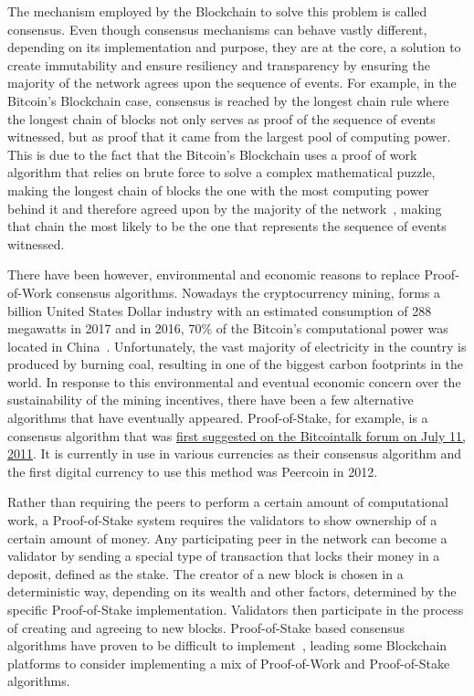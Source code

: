 The mechanism employed by the Blockchain to solve this problem is called
consensus.  Even though consensus mechanisms can behave vastly different,
depending on its implementation and purpose, they are at the core, a solution
to create immutability and ensure resiliency and transparency by ensuring the
majority of the network agrees upon the sequence of events. For example, in the
Bitcoin's Blockchain case, consensus is reached by the longest chain rule where
the longest chain of blocks not only serves as proof of the sequence of events
witnessed, but as proof that it came from the largest pool of computing power.
This is due to the fact that the Bitcoin's Blockchain uses a proof of work
algorithm that relies on brute force to solve a complex mathematical puzzle,
making the longest chain of blocks the one with the most computing power behind
it and therefore agreed upon by the majority of the
network~\cite{Baars2016,Wood2017}, making that chain the most likely to be the
one that represents the sequence of events witnessed.

There have been however, environmental and economic reasons to replace
Proof-of-Work consensus algorithms. Nowadays the cryptocurrency mining, forms a
billion United States Dollar industry with an estimated consumption of 288
megawatts in 2017 and in 2016, 70\% of the Bitcoin's computational power was
located in China~\cite{BitcoinMining2017}.  Unfortunately, the vast majority of
electricity in the country is produced by burning coal, resulting in one of the
biggest carbon footprints in the world. In response to this environmental and
eventual economic concern over the sustainability of the mining incentives,
there have been a few alternative algorithms that have eventually appeared.
Proof-of-Stake, for example, is a consensus algorithm that was
\href{https://bitcointalk.org/index.php?topic=27787.0}{first suggested on the
Bitcointalk forum on July 11, 2011}. It is currently in use in various
currencies as their consensus algorithm and the first digital currency to use
this method was Peercoin in 2012. 

Rather than requiring the peers to perform a certain amount of computational
work, a Proof-of-Stake system requires the validators to show ownership of a
certain amount of money. Any participating peer in the network can become a
validator by sending a special type of transaction that locks their money in a
deposit, defined as the stake. The creator of a new block is chosen in a
deterministic way, depending on its wealth and other factors, determined by the
specific Proof-of-Stake implementation. Validators then participate in the
process of creating and agreeing to new blocks. Proof-of-Stake based consensus
algorithms have proven to be difficult to implement~\cite{EthereumSlasher2014},
leading some Blockchain platforms to consider implementing a mix of
Proof-of-Work and Proof-of-Stake algorithms.


